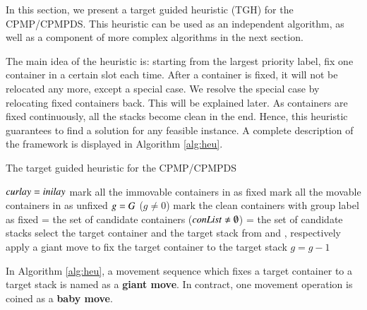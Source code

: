 \documentclass[review,3p,times,authoryear,12pt]{elsarticle}
\begin{document}
In this section, we present a target guided heuristic (TGH) for the CPMP/CPMPDS. This heuristic can be used as an independent algorithm, as well as a component of more complex algorithms in the next section.

The main idea of the heuristic is: starting from the largest priority label, fix one container in a certain slot each time. After a container is fixed, it will not be relocated any more, except a special case. We resolve the special case by relocating fixed containers back. This will be explained later.
As containers are fixed continuously, all the stacks become clean in the end. Hence, this heuristic guarantees to find a solution for any feasible instance. A complete description of the framework is displayed in Algorithm \ref{alg:heu}.

\begin{algorithm}[htbp]
	\caption{The target guided heuristic for the CPMP/CPMPDS}
	\label{alg:heu}
	\begin{codebox}
	\li $\id{curlay} = \id{inilay}$
    \li mark all the immovable containers in  as fixed
    \li mark all the movable containers in  as unfixed
    \li $\id{g} = G$
    \li \While ($g\neq0$)
    \li \Do
            mark the clean containers with group label  as fixed\label{heu:c}
    \li     {} = the set of candidate containers
    \li     \While($\id{conList} \neq \emptyset$)\label{heu:l}
    \li     \Do
                 = the set of candidate stacks
    \li         select the target container and the target stack from  and , respectively
    \li         apply a giant move to fix the target container to the target stack
            \End
    \li $g=g-1$
        \End
	\end{codebox}	
\end{algorithm}

In Algorithm \ref{alg:heu}, a movement sequence which fixes a target container to a target stack is named as a \textbf{giant move}. In contract, one movement operation is coined as a \textbf{baby move}.
\end{document}
